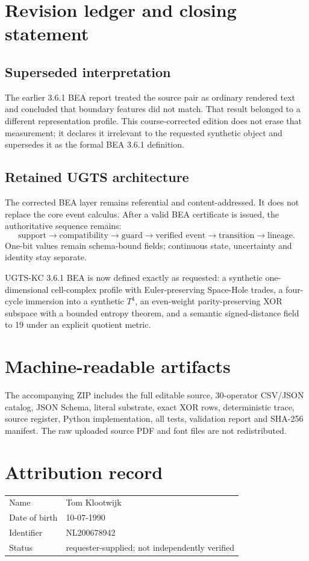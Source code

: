 \documentclass[10pt,a4paper]{article}
\begin{document}
\section{Revision ledger and closing statement}

\subsection{Superseded interpretation}
The earlier 3.6.1 BEA report treated the source pair as ordinary rendered text and concluded that boundary features did not match. That result belonged to a different representation profile. This course-corrected edition does not erase that measurement; it declares it irrelevant to the requested synthetic object and supersedes it as the formal BEA 3.6.1 definition.

\subsection{Retained UGTS architecture}
The corrected BEA layer remains referential and content-addressed. It does not replace the core event calculus. After a valid BEA certificate is issued, the authoritative sequence remains:
\[
\text{support}\to\text{compatibility}\to\text{guard}\to
\text{verified event}\to\text{transition}\to\text{lineage}.
\]
One-bit values remain schema-bound fields; continuous state, uncertainty and identity stay separate.

\begin{decisionbox}
UGTS-KC 3.6.1 BEA is now defined exactly as requested: a synthetic one-dimensional cell-complex profile with Euler-preserving Space-Hole trades, a four-cycle immersion into a synthetic $T^4$, an even-weight parity-preserving XOR subspace with a bounded entropy theorem, and a semantic signed-distance field to 19 under an explicit quotient metric.
\end{decisionbox}

\appendix
\section{Machine-readable artifacts}
The accompanying ZIP includes the full editable source, 30-operator CSV/JSON catalog, JSON Schema, literal substrate, exact XOR rows, deterministic trace, source register, Python implementation, all tests, validation report and SHA-256 manifest. The raw uploaded source PDF and font files are not redistributed.

\section{Attribution record}
\begin{tabular}{ll}
\toprule
Name & Tom Klootwijk\\
Date of birth & 10-07-1990\\
Identifier & NL200678942\\
Status & requester-supplied; not independently verified\\
\bottomrule
\end{tabular}
\end{document}
